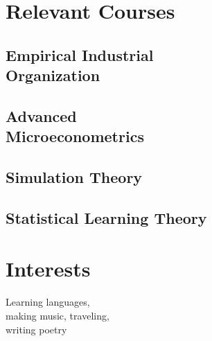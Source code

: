 \documentclass[]{resume}
\begin{document}
\begin{minipage}[t]{0.25\textwidth}
\section{Relevant Courses}
\subsection{Empirical Industrial \\ Organization}
\sectionsep

\subsection{Advanced \\ Microeconometrics}
\sectionsep

\subsection{Simulation Theory}
\sectionsep

\subsection{Statistical Learning Theory}
\sectionsep
\sectionsep


\section{Interests}
Learning languages, \\
making music,
traveling, \\
writing poetry

\end{minipage}
\end{document}
